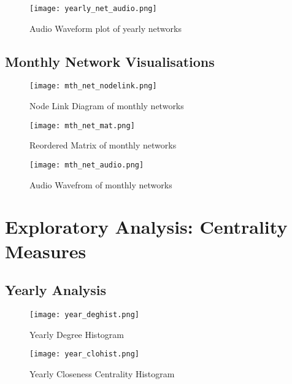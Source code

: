 \begin{figure}[H]
    \centering
    \texttt{[image: yearly\_net\_audio.png]}
    \caption{Audio Waveform plot of yearly networks}
    \label{fig:Audio Waveform Plot for the yearly networks}
\end{figure}

\subsection{Monthly Network Visualisations}
\begin{figure}[H]
    \centering
    \texttt{[image: mth\_net\_nodelink.png]}
    \caption{Node Link Diagram of monthly networks}
    \label{fig:node mth}
\end{figure}

\begin{figure}[H]
    \centering
    \texttt{[image: mth\_net\_mat.png]}
    \caption{Reordered Matrix of monthly networks}
    \label{fig:Reordered Matrix Diagram for the monthly networks}
\end{figure}

\begin{figure}[H]
    \centering
    \texttt{[image: mth\_net\_audio.png]}
    \caption{Audio Wavefrom  of monthly networks}
    \label{fig:Audio Waveform Plot for the monthly networks}
\end{figure}

\section{Exploratory Analysis: Centrality Measures} \label{explanal}

\subsection{Yearly Analysis}
\begin{figure}[H]
    \centering
    \texttt{[image: year\_deghist.png]}
    \caption{Yearly Degree Histogram}
    \label{fig:Yearly Degree Histogram}
\end{figure}

\begin{figure}[H]
    \centering
    \texttt{[image: year\_clohist.png]}
    \caption{Yearly Closeness Centrality Histogram}
    \label{fig:Yearly Closeness Centrality Histogram}
\end{figure}

